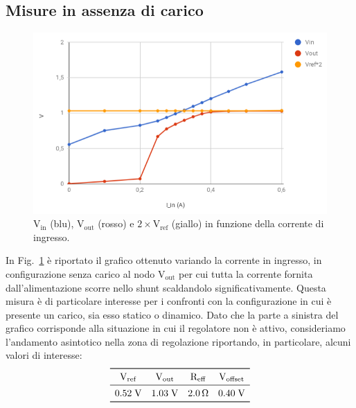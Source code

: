 \subsection{Misure in assenza di carico}

\begin{figure}
\centering
\includegraphics[scale=.5]{Immagini/provaSLDO5}
\caption{$\mathrm{V_{in}}$ (blu), $\mathrm{V_{out}}$ (rosso) e $\mathrm{2\times V_{ref}}$ (giallo) in funzione della corrente di ingresso.}
\label{provaSLDO5}
\end{figure}
In Fig.~\ref{provaSLDO5} è riportato il grafico ottenuto variando la corrente in ingresso, in configurazione senza carico al nodo $\mathrm{V_{out}}$ per cui tutta la corrente fornita dall'alimentazione scorre nello shunt scaldandolo significativamente. Questa misura è di particolare interesse per i confronti con la configurazione in cui è presente un carico, sia esso statico o dinamico.
Dato che la parte a sinistra del grafico corrisponde alla situazione in cui il regolatore non è attivo, consideriamo l'andamento asintotico nella zona di regolazione riportando, in particolare, alcuni valori di interesse:
\[
\begin{array}{cccc}
\toprule
\mathrm{V_{ref}} & \mathrm{V_{out}} & \mathrm{R_{eff}} & \mathrm{V_{offset}} \\
\midrule
0.52\V & 1.03\V & 2.0\Ohm & 0.40\V \\
\bottomrule
\end{array}
\]

